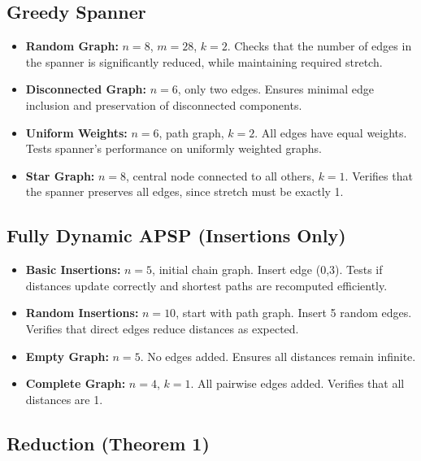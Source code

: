 \documentclass[12pt]{article}
\begin{document}
\subsection*{Greedy Spanner}

\begin{itemize}
    \item \textbf{Random Graph:} $n = 8$, $m = 28$, $k = 2$. Checks that the number of edges in the spanner is significantly reduced, while maintaining required stretch.
    
    \item \textbf{Disconnected Graph:} $n = 6$, only two edges. Ensures minimal edge inclusion and preservation of disconnected components.
    
    \item \textbf{Uniform Weights:} $n = 6$, path graph, $k = 2$. All edges have equal weights. Tests spanner's performance on uniformly weighted graphs.
    
    \item \textbf{Star Graph:} $n = 8$, central node connected to all others, $k = 1$. Verifies that the spanner preserves all edges, since stretch must be exactly 1.
\end{itemize}

\subsection*{Fully Dynamic APSP (Insertions Only)}

\begin{itemize}
    \item \textbf{Basic Insertions:} $n = 5$, initial chain graph. Insert edge (0,3). Tests if distances update correctly and shortest paths are recomputed efficiently.
    
    \item \textbf{Random Insertions:} $n = 10$, start with path graph. Insert 5 random edges. Verifies that direct edges reduce distances as expected.
    
    \item \textbf{Empty Graph:} $n = 5$. No edges added. Ensures all distances remain infinite.
    
    \item \textbf{Complete Graph:} $n = 4$, $k = 1$. All pairwise edges added. Verifies that all distances are 1.
\end{itemize}

\subsection*{Reduction (Theorem 1)}
\end{document}
